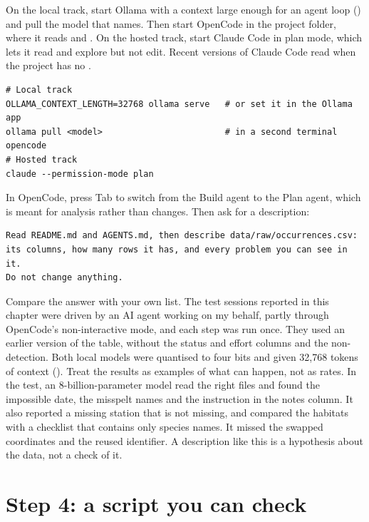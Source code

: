 On the local track, start Ollama with a context large enough for an agent
loop () and pull the model that  names.
Then start OpenCode in the project folder, where it reads  and
. On the hosted track, start Claude Code in plan mode,
which lets it read and explore but not edit. Recent versions of Claude Code
read  when the project has no .

\begin{lstlisting}[style=shell,caption={Start the session}]
# Local track
OLLAMA_CONTEXT_LENGTH=32768 ollama serve   # or set it in the Ollama app
ollama pull <model>                        # in a second terminal
opencode
# Hosted track
claude --permission-mode plan
\end{lstlisting}

In OpenCode, press Tab to switch from the Build agent to the Plan agent, which
is meant for analysis rather than changes. Then ask for a description:

\begin{lstlisting}[caption={The first prompt}]
Read README.md and AGENTS.md, then describe data/raw/occurrences.csv:
its columns, how many rows it has, and every problem you can see in it.
Do not change anything.
\end{lstlisting}

Compare the answer with your own list. The test sessions reported in this
chapter were driven by an AI agent working on my behalf, partly through
OpenCode's non-interactive mode, and each step was run once. They used an
earlier version of the table, without the status and effort columns and the
non-detection. Both local models were quantised to four bits and given 32,768
tokens of context (). Treat the results as examples of
what can happen, not as rates. In the test, an 8-billion-parameter model
read the right files and found the impossible date, the misspelt names and
the instruction in the notes column.
It also reported a missing station that is not missing, and compared the
habitats with a checklist that contains only species names. It missed the
swapped coordinates and the reused identifier. A description like this is a
hypothesis about the data, not a check of it.

\section{Step 4: a script you can check}


